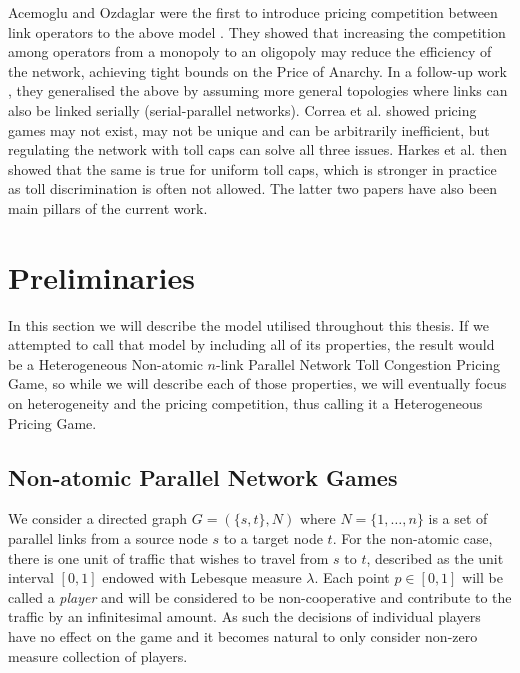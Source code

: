 \documentclass[10pt,a4paper]{book}
\theoremstyle{definition}
\theoremstyle{comment}
\begin{document}
Acemoglu and Ozdaglar were the first to introduce pricing competition between link operators to the above model \cite{10.1287/moor.1060.0231}.
They showed that increasing the competition among operators from a monopoly to an oligopoly may reduce the efficiency of the network, achieving tight bounds on the Price of Anarchy.
In a follow-up work \cite{10.1109/JSAC.2007.070812}, they generalised the above by assuming more general topologies where links can also be linked serially (serial-parallel networks).
Correa et al. \cite{correa2018pricing} showed pricing games may not exist, may not be unique and can be arbitrarily inefficient, but regulating the network with toll caps can solve all three issues.
Harkes et al. \cite{Harks_2019} then showed that the same is true for uniform toll caps, which is stronger in practice as toll discrimination is often not allowed.
The latter two papers have also been main pillars of the current work.


\cleardoublepage


\chapter{Preliminaries}
\label{chapter:preliminaries}

In this section we will describe the model utilised throughout this thesis.
If we attempted to call that model by including all of its properties, the result would be a Heterogeneous Non-atomic $n$-link Parallel Network Toll Congestion Pricing Game, so while we will describe each of those properties, we will eventually focus on heterogeneity and the pricing competition, thus calling it a Heterogeneous Pricing Game.

\section*{Non-atomic Parallel Network Games}

We consider a directed graph $G = (\{s, t\}, N)$ where $N = \{1,\dots, n\}$ is a set of parallel links from a source node $s$ to a target node $t$.
For the non-atomic case, there is one unit of traffic that wishes to travel from $s$ to $t$, described as the unit interval $[0, 1]$ endowed with Lebesque measure $\lambda$.
Each point $p \in [0, 1]$ will be called a \textit{player} and will be considered to be non-cooperative and contribute to the traffic by an infinitesimal amount.
As such the decisions of individual players have no effect on the game and it becomes natural to only consider non-zero measure collection of players.
\end{document}
